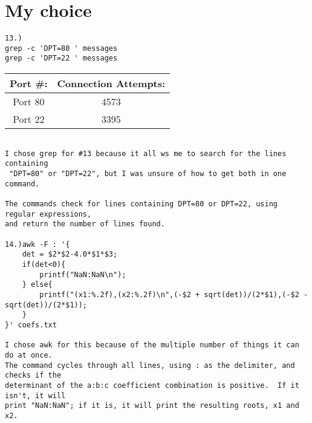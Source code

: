 \section{My choice}
\begin{verbatim} 
13.)
grep -c 'DPT=80 ' messages
grep -c 'DPT=22 ' messages

\end{verbatim} 
\begin{tabular}{ | c | c | } 
\hline 
Port #: & Connection Attempts: \\ \hline 
Port 80 & 4573 \\ \hline 
Port 22 & 3395 \\ \hline 
\end{tabular} 
\begin{verbatim}

I chose grep for #13 because it all ws me to search for the lines containing
 "DPT=80" or "DPT=22", but I was unsure of how to get both in one command.   

The commands check for lines containing DPT=80 or DPT=22, using regular expressions,
and return the number of lines found. 

14.)awk -F : '{
	det = $2*$2-4.0*$1*$3;
	if(det<0){
		printf("NaN:NaN\n");
	} else{
		printf("(x1:%.2f),(x2:%.2f)\n",(-$2 + sqrt(det))/(2*$1),(-$2 - sqrt(det))/(2*$1));
	}
}' coefs.txt

I chose awk for this because of the multiple number of things it can do at once.  
The command cycles through all lines, using : as the delimiter, and checks if the 
determinant of the a:b:c coefficient combination is positive.  If it isn't, it will 
print "NaN:NaN"; if it is, it will print the resulting roots, x1 and x2.  


\end{verbatim}

